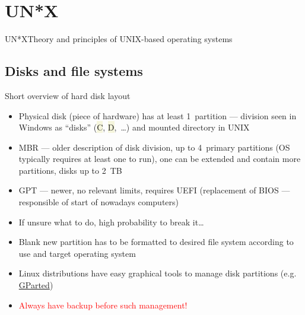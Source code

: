 \documentclass[compress, xelatex, 11pt, xcolor=svgnames, aspectratio=169,
	hyperref={
		bookmarks=true,
		unicode=true,
		colorlinks=true,
		pdftitle={Linux, command line and MetaCentrum},
		plainpages=false,
		pdfauthor={Vojtech Zeisek},
		pdfsubject={Course about use of Linux command line, writing shell scripts and using MetaCentrum of CESNET},
		pdfcreator={XeLaTeX},
		pdfkeywords={Linux, GNU, BASH, shell, command line, MetaCentrum},
		linkcolor=DarkRed, %
		anchorcolor=DarkBlue, %
		citecolor=Indigo, %
		filecolor=NavyBlue, %
		menucolor=DarkMagenta, %
		urlcolor=DarkBlue, %
		},
	url={hyphens, lowtilde} %
	]{beamer}
\renewcommand{\texttt}[1]{\colorbox{Beige}{{\ttfamily #1}}}
\renewcommand{\alert}[1]{\textcolor{red}{#1}}
\begin{document}
\section{UN*X}

\begin{frame}{UN*X}{Theory and principles of UNIX-based operating systems}
	\tableofcontents[currentsection, sectionstyle=show/hide, hideothersubsections]
\end{frame}

\subsection{Disks and file systems}

\begin{frame}{Short overview of hard disk layout}
	\begin{itemize}
		\item Physical disk (piece of hardware) has at least 1~partition --- division seen in Windows as \enquote{disks} (\texttt{C}, \texttt{D},~\ldots) and mounted directory in UNIX
		\item MBR --- older description of disk division, up to 4~primary partitions (OS typically requires at least one to run), one can be extended and contain more partitions, disks up to 2~TB
		\item GPT --- newer, no relevant limits, requires UEFI (replacement of BIOS --- responsible of start of nowadays computers)
		\item If unsure what to do, high probability to break it\ldots
		\item Blank new partition has to be formatted to desired file system according to use and target operating system
		\item Linux distributions have easy graphical tools to manage disk partitions (e.g. \href{https://gparted.org/}{GParted})
		\item \alert{Always have backup before such management!}
	\end{itemize}
\end{frame}
\end{document}
